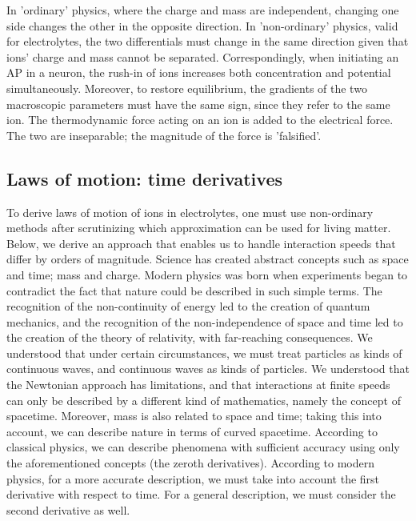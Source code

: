 In 'ordinary' physics, where the charge and mass are independent,
changing one side changes the other in the opposite direction.
In 'non-ordinary' physics, valid for electrolytes, the two differentials must change in the same direction
given that ions' charge and mass cannot be separated.
Correspondingly, when initiating an \gls{AP} in a neuron, the rush-in of ions
increases both concentration and potential simultaneously. 
Moreover, to restore equilibrium, the gradients of the two macroscopic parameters must have the same sign, since they refer to the same ion.
The thermodynamic force acting on an ion is added to the electrical force.
The two are inseparable; the magnitude of the force is 'falsified'. 



\subsection[Laws of motion]{Laws of motion: time derivatives\label{sec:Nernst-time-derivatives}\label{sec:Physics-LawsOfMotion}}


To derive laws of motion of ions in electrolytes, one must use non-ordinary methods after scrutinizing which approximation can be used for living matter.  Below, we derive an approach that enables us to handle interaction speeds that differ by orders of magnitude. Science has created abstract concepts such as space and time; mass and charge. Modern physics was born when experiments began to contradict the fact that nature could be described in such simple terms. The recognition of the non-continuity of energy led to the creation of quantum mechanics, and the recognition of the non-independence of space and time led to the creation of the theory of relativity, with far-reaching consequences. We understood that under certain circumstances, we must treat particles as kinds of continuous waves, and continuous waves as kinds of particles. We understood that the Newtonian approach has limitations, and that interactions at finite speeds can only be described by a different kind of mathematics, namely the concept of spacetime. Moreover, mass is also related to space and time; taking this into account, we can describe nature in terms of curved spacetime. According to classical physics, we can describe phenomena with sufficient accuracy using only the aforementioned concepts (the zeroth derivatives). According to modern physics, for a more accurate description, we must take into account the first derivative with respect to time. For a general description, we must consider the second derivative as well.

